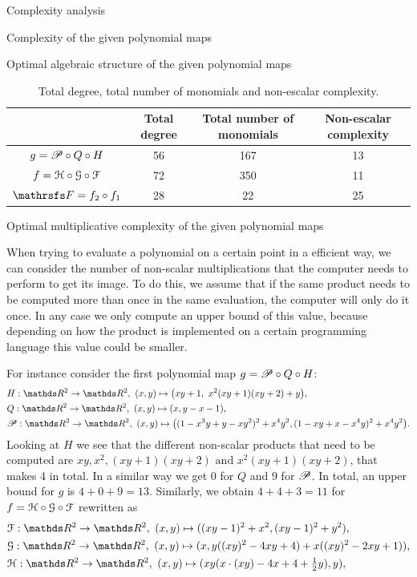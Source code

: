 \documentclass[11pt, a4paper, english, twoside, notitlepage, openright]{report}
\begin{document}
\begin{chapter}{Complexity analysis}
\begin{section}{Complexity of the given polynomial maps}
\begin{subsection}{Optimal algebraic structure of the given polynomial maps}
\begin{table}[t]
\begin{center}
\begin{tabular}{c || c | c | c}
& Total degree & Total number of monomials & Non-escalar complexity\\ \hline \hline
$g = \P\circ Q \circ H$ & 56 & 167 & 13 \\ \hline
$f=\HH\circ\GG\circ\FF$ & 72 &  350 & 11\\ \hline
$\FFF = f_2 \circ f_1$ & 28 & 22 & 25\\	
\end{tabular}
\caption{Total degree, total number of monomials and non-escalar complexity.}\label{tab:degreeMon}
\end{center}
\end{table}

\end{subsection}

\begin{subsection}{Optimal multiplicative complexity of the given polynomial maps}

When trying to evaluate a polynomial on a certain point in a efficient way, we can consider the number of non-scalar multiplications that the computer needs to perform to get its image. To do this, we assume that if the same product needs to be computed more than once in the same evaluation, the computer will only do it once. In any case we only compute an upper bound of this value, because depending on how the product is implemented on a certain programming language this value could be smaller.

For instance consider the first polynomial map $g = \P\circ Q \circ H$:
\begin{align*}
&H:\R^2\to\R^2,\ (x,y)\mapsto\big(xy+1,\ x^2(xy+1)(xy+2)+y\big), \\
&Q:\R^2\to\R^2,\ (x,y)\mapsto(x,y-x-1), \\
&\P:\R^2\to\R^2,\ (x,y)\mapsto\big((1-x^3y+y-xy^2)^2+x^4y^2, (1-xy+x-x^4y)^2+x^4y^2\big).\\
\end{align*}
Looking at $H$ we see that the different non-scalar products that need to be computed are $xy, x^2, (xy + 1)(xy+2) \text{ and } x^2(xy + 1)(xy+2)$, that makes 4 in total. In a similar way we get 0 for $Q$ and $9$ for $\P$. In total, an upper bound for $g$ is $4 + 0 + 9 = 13$. Similarly, we obtain $4+4+3=11$ for $f=\HH\circ\GG\circ\FF$ rewritten as
\begin{align*}
&\FF:\R^2\to\R^2,\  (x,y)\mapsto((xy-1)^2+x^2,(xy-1)^2+y^2),\\
&\GG:\R^2\to\R^2,\  (x,y)\mapsto(x,y((xy)^2-4xy+4)+x((xy)^2-2xy+1)),\\
&\HH:\R^2\to\R^2,\  (x,y)\mapsto(xy(x\cdot(xy)-4x+4+\tfrac{1}{2}y),y),
\end{align*}


\end{subsection}
\end{section}
\end{chapter}
\end{document}
